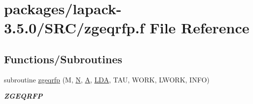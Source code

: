 \hypertarget{zgeqrfp_8f}{}\section{packages/lapack-\/3.5.0/\+S\+R\+C/zgeqrfp.f File Reference}
\label{zgeqrfp_8f}
\subsection*{Functions/\+Subroutines}
\begin{DoxyCompactItemize}
\item 
subroutine \hyperlink{group__complex16GEcomputational_gadb2733d56f109ea5b0f016a683687d2a}{zgeqrfp} (M, \hyperlink{polmisc_8c_a0240ac851181b84ac374872dc5434ee4}{N}, \hyperlink{classA}{A}, \hyperlink{example__user_8c_ae946da542ce0db94dced19b2ecefd1aa}{L\+D\+A}, T\+A\+U, W\+O\+R\+K, L\+W\+O\+R\+K, I\+N\+F\+O)
\begin{DoxyCompactList}\small\item\em {\bfseries Z\+G\+E\+Q\+R\+F\+P} \end{DoxyCompactList}\end{DoxyCompactItemize}
